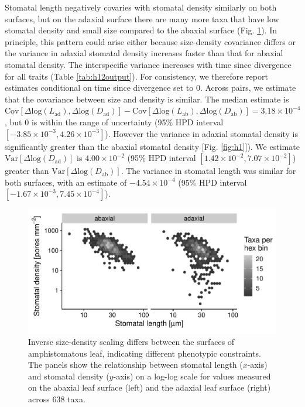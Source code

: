 \documentclass[
  12pt,
]{article}
\begin{document}
Stomatal length negatively covaries with stomatal density similarly on both surfaces, but on the adaxial surface there are many more taxa that have low stomatal density and small size compared to the abaxial surface (Fig. \ref{fig:h1_raw}). In principle, this pattern could arise either because size-density covariance differs or the variance in adaxial stomatal density increases faster than that for abaxial stomatal density. The interspecific variance increases with time since divergence for all traits (Table \ref{tab:h12output}). For consistency, we therefore report estimates conditional on time since divergence set to 0. Across pairs, we estimate that the covariance between size and density is similar. The median estimate is \(\text{Cov}[\Delta \text{log}(L_\text{ad}), \Delta \text{log}(D_\text{ad})] - \text{Cov}[\Delta \text{log}(L_\text{ab}), \Delta \text{log}(D_\text{ab})] = 3.18 \times 10^{-4}\), but 0 is within the range of uncertainty (95\% HPD interval \([-3.85 \times 10^{-3},4.26 \times 10^{-3}]\)). However the variance in adaxial stomatal density is significantly greater than the abaxial stomatal density {[}Fig. \ref{fig:h1}{]}). We estimate \(\text{Var}[\Delta \text{log}(D_\text{ad})]\) is \(4.00 \times 10^{-2}\) (95\% HPD interval \([1.42 \times 10^{-2},7.07 \times 10^{-2}]\)) greater than \(\text{Var}[\Delta \text{log}(D_\text{ab})]\). The variance in stomatal length was similar for both surfaces, with an estimate of \(-4.54 \times 10^{-4}\) (95\% HPD interval \([-1.67 \times 10^{-3},7.45 \times 10^{-4}]\)).

\begin{figure}[ht]
\includegraphics[width=\textwidth]{../figures/h1-raw.pdf}
\caption{Inverse size-density scaling differs between the surfaces of amphistomatous leaf, indicating different phenotypic constraints. The panels show the relationship between stomatal length ($x$-axis) and stomatal density ($y$-axis) on a log-log scale for values measured on the abaxial leaf surface (left) and the adaxial leaf surface (right) across 638 taxa.}
\label{fig:h1_raw}
\end{figure}
\end{document}

